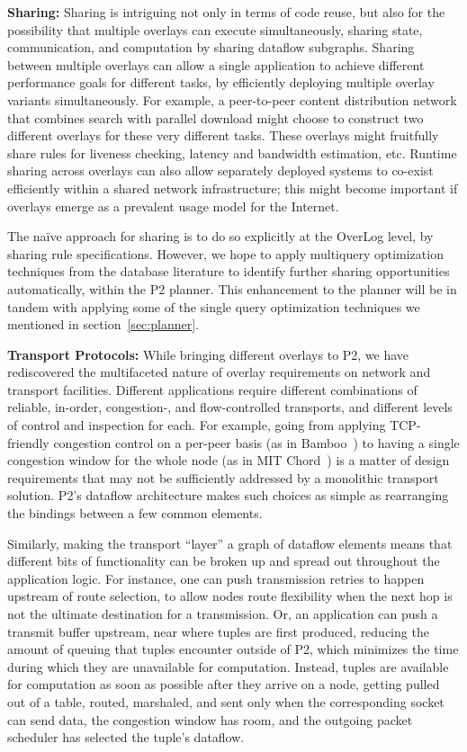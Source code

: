 \documentclass{sig-alt-full}
\def\Sys{P2\xspace}
\def\Lang{OverLog\xspace}
\begin{document}
{\bf Sharing:} Sharing is intriguing
not only in terms of code reuse, but also for the
possibility that multiple overlays can execute
simultaneously, sharing state, communication, and
computation by sharing dataflow subgraphs.  Sharing
between multiple overlays can allow a single
application to achieve different performance goals
for different tasks, by efficiently deploying
multiple overlay variants simultaneously.  For
example, a peer-to-peer content distribution
network that combines search with parallel download
might choose to construct two different overlays
for these very different tasks.  These overlays
might fruitfully share rules for liveness checking,
latency and bandwidth estimation, etc.  Runtime
sharing across overlays can also allow
separately deployed systems to co-exist efficiently
within a shared network infrastructure; 
this might become important if overlays emerge as a
prevalent usage model for the Internet.

The na\"{i}ve approach for sharing is to do so explicitly at the \Lang
level, by sharing rule specifications.  However, we hope to
apply multiquery optimization techniques from the database literature
to identify further sharing opportunities automatically, within
the \Sys planner.  This enhancement to the planner will be in tandem
with applying some of the single query optimization techniques we
mentioned in section~\ref{sec:planner}.


{\bf Transport Protocols:} While bringing different
overlays to \Sys, we have rediscovered the
multifaceted nature of overlay requirements on
network and transport facilities.  Different
applications require different combinations of
reliable, in-order, congestion-, and
flow-controlled transports, and different levels of
control and inspection for each.  For example,
going from applying TCP-friendly congestion control
on a per-peer basis (as in
Bamboo~\cite{rhea_usenix_2004}) to having a single
congestion window for the whole node (as in MIT
Chord~\cite{li04comparing}) is a matter of design
requirements that may not be sufficiently addressed
by a monolithic transport solution.  \Sys's
dataflow architecture makes such choices as simple
as rearranging the bindings between a few common
elements.

Similarly, making the transport ``layer'' a graph
of dataflow elements means that different bits of
functionality can be broken up and spread out
throughout the application logic.  For instance,
one can push transmission retries to happen
upstream of route selection, to allow nodes route
flexibility when the next hop is not the ultimate
destination for a transmission.  Or, an application
can push a transmit buffer upstream, near where
tuples are first produced, reducing the amount of
queuing that tuples encounter outside of \Sys,
which minimizes the time during which they are
unavailable for computation.  Instead, tuples are
available for computation as soon as possible after
they arrive on a node, getting pulled out of a
table, routed, marshaled, and sent only when the
corresponding socket can send data, the congestion
window has room, and the outgoing packet scheduler
has selected the tuple's dataflow.
\end{document}
